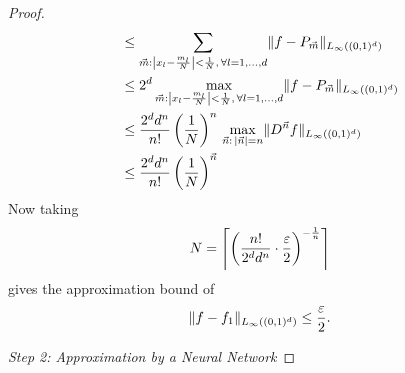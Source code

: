 \begin{proof}
\begin{align}
        &\leq \sum_{\vec{m}: \left\vert x_l - \frac{m_l}{N} \right\vert < \frac{1}{N}, \, \forall l = 1, \dots, d} 
        \lVert f - P_{\vec{m}} \rVert_{L_\infty((0,1)^d)} \label{align: f-f1 eq 1}\\
        &\leq 2^d \max\limits_{\vec{m}: \left\vert x_l - \frac{m_l}{N} \right\vert < \frac{1}{N}, \, \forall l = 1, \dots, d}
        \lVert f - P_{\vec{m}} \rVert_{L_\infty((0,1)^d)} \label{align: f-f1 eq 2}\\
        &\leq \frac{2^d d^n}{n!} \left( \frac{1}{N} \right)^n \, 
        \max\limits_{\vec{n}: \, \vert \vec{n} \vert = n} \lVert D^{\vec{n}} f \rVert_{L_\infty((0,1)^d)} 
        \label{align: f-f1 eq 3}\\
        &\leq \frac{2^d d^n}{n!} \left( \frac{1}{N} \right)^{\vec{n}} \label{align: f-f1 eq 4}
    \end{align}
    Now taking
    \begin{equation*}
        N = \left\lceil\left( \frac{n!}{2^d d^n} \cdot \frac{\varepsilon}{2} \right)^{-\frac{1}{n}}\right\rceil
    \end{equation*}
    gives the approximation bound of 
    \begin{equation} \label{eq: f-f1 bound in yarotsky}
        \lVert f - f_1 \rVert_{L_\infty((0,1)^d)} \leq \frac{\varepsilon}{2}.
    \end{equation}

    \vspace{0.5cm}
    \noindent\textit{Step 2: Approximation by a Neural Network}


\end{proof}

